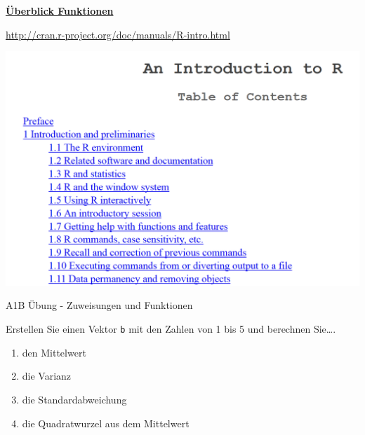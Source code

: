 \documentclass[ignorenonframetext,]{beamer}
\begin{document}
\begin{frame}{\href{http://cran.r-project.org/doc/manuals/R-intro.html}{\textbf{Überblick
Funktionen}}}

\url{http://cran.r-project.org/doc/manuals/R-intro.html}

\includegraphics{figure/UebersichtBefehle.PNG}

\end{frame}

\begin{frame}[fragile]{A1B Übung - Zuweisungen und Funktionen}

Erstellen Sie einen Vektor \texttt{b} mit den Zahlen von 1 bis 5 und
berechnen Sie\ldots{}.

\begin{enumerate}
\def\labelenumi{\arabic{enumi}.}
\item
  den Mittelwert
\item
  die Varianz
\item
  die Standardabweichung
\item
  die Quadratwurzel aus dem Mittelwert
\end{enumerate}

\end{frame}
\end{document}
